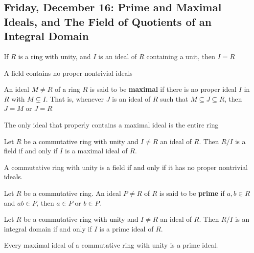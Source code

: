 \subsection{Friday, December 16: Prime and Maximal Ideals, and The Field of Quotients of an Integral Domain}

\begin{theorem}
    If $R$ is a ring with unity, and $I$ is an ideal of $R$ containing a unit, then $I = R$
\end{theorem}

\begin{corollary}
    A field contains no proper nontrivial ideals
\end{corollary}

\begin{definition}
    An ideal $M \neq R$ of a ring $R$ is said to be \textbf{maximal} if there is no proper ideal $I$ in $R$ with $M \subsetneq I$. That is, whenever $J$ is an ideal of $R$ such that $M \subseteq J \subseteq R$, then $J = M$ or $J = R$
\end{definition}

\begin{remark}
    The only ideal that properly contains a maximal ideal is the entire ring
\end{remark}

\begin{theorem}
    Let $R$  be a commutative ring with unity and $I \neq R$ an ideal of $R$. Then $R/I$ is a field if and only if $I$ is a maximal ideal of $R$.
\end{theorem}

\begin{corollary}
    A commutative ring with unity is a field if and only if it has no proper nontrivial ideals.
\end{corollary}

\begin{definition}
    Let $R$ be a commutative ring. An ideal $P \neq R$ of $R$ is said to be \textbf{prime} if $a, b \in R$ and $ab \in P$, then $a \in P$ or $b \in P$.
\end{definition}

\begin{theorem}
    Let $R$ be a commutative ring with unity and $I \neq R$ an ideal of $R$. Then $R/I$ is an integral domain if and only if $I$ is a prime ideal of $R$.
\end{theorem}

\begin{corollary}
    Every maximal ideal of a commutative ring with unity is a prime ideal.
\end{corollary}

